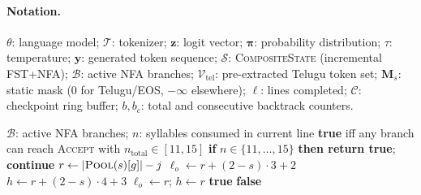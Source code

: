 \documentclass[11pt]{article}
\begin{document}
\paragraph{Notation.}
$\theta$: language model;\;
$\mathcal{T}$: tokenizer;\;
$\mathbf{z}$: logit vector;\;
$\boldsymbol{\pi}$: probability distribution;\;
$\tau$: temperature;\;
$\mathbf{y}$: generated token sequence;\;
$\mathcal{S}$: \textsc{CompositeState} (incremental FST+NFA);\;
$\mathcal{B}$: active NFA branches;\;
$\mathcal{V}_{\text{tel}}$: pre-extracted Telugu token set;\;
$\mathbf{M}_s$: static mask ($0$ for Telugu/EOS, $-\infty$ elsewhere);\;
$\ell$: lines completed;\;
$\mathcal{C}$: checkpoint ring buffer;\;
$b, b_c$: total and consecutive backtrack counters.



\begin{algorithm}[H]
\caption{\textsc{IsReachable}: Dead State Detection}
\label{alg:is-reachable}
\scriptsize
\begin{algorithmic}[1]
\Require $\mathcal{B}$: active NFA branches;\;
         $n$: syllables consumed in current line
\Ensure \textbf{true} iff any branch can reach \textsc{Accept}
        with $n_{\text{total}} \in [11, 15]$
        \State \textbf{if} $n \in \{11,\ldots,15\}$
               \textbf{then return true};\;
               \textbf{continue}
    \EndIf
    \State $r \gets |\textsc{Pool}(s)[g]| - j$
     
        \State $\ell_o \gets r + (2{-}s) \cdot 3 + 2$
        \State $h \gets r + (2{-}s) \cdot 4 + 3$
    \Else {}
        \State $\ell_o \gets r$;\; $h \gets r$
    \EndIf
        \State \Return \textbf{true}
    \EndIf
\EndFor
\State \Return \textbf{false} 
\end{algorithmic}
\end{algorithm}


\end{document}
